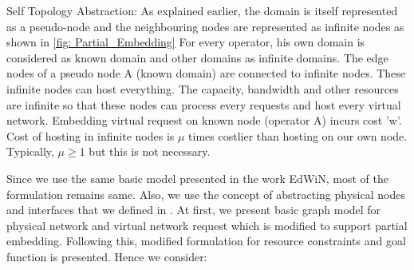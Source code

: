 \documentclass[article,dr=phil,type=msc ,colorback,accentcolor=tud4b]{tudthesis}
\begin{document}
Self Topology Abstraction: As explained earlier, the domain is itself represented as a pseudo-node and the neighbouring nodes are represented as infinite nodes as shown in \ref{fig: Partial_Embedding} For every operator, his own domain is considered as known domain and other domains as infinite domains. The edge nodes of a pseudo node A (known domain) are connected to infinite nodes. These infinite nodes can host everything. The capacity, bandwidth and other resources are infinite so that these nodes can process every requests and host every virtual network. Embedding virtual request on known node (operator A) incurs cost 'w'. Cost of hosting in infinite nodes is $\mu$ times costlier than hosting on our own node. Typically,  $\mu \geq 1$ but this is not necessary. \newline

Since we use the same basic model presented in the work EdWiN, most of the formulation remains same. Also, we use the concept of abstracting physical nodes and interfaces that we defined in \cite{7116141}. At first, we present basic graph model for physical network and virtual network request which is modified to support partial embedding. Following this, modified formulation for resource constraints and goal function is presented. Hence we consider:
\end{document}
